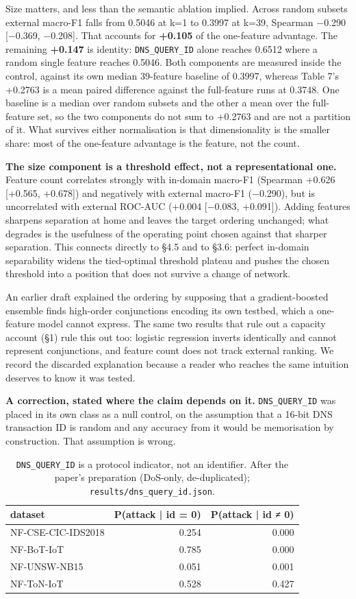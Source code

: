\documentclass[11pt,a4paper]{article}
\begin{document}
Size matters, and less than the semantic ablation implied. Across random subsets external macro-F1 falls from 0.5046 at k=1 to 0.3997 at k=39, Spearman $-$0.290 [$-$0.369, $-$0.208]. That accounts for \textbf{+0.105} of the one-feature advantage. The remaining \textbf{+0.147} is identity: \texttt{DNS\_QUERY\_ID} alone reaches 0.6512 where a random single feature reaches 0.5046. Both components are measured inside the control, against its own median 39-feature baseline of 0.3997, whereas Table 7's +0.2763 is a mean paired difference against the full-feature runs at 0.3748. One baseline is a median over random subsets and the other a mean over the full-feature set, so the two components do not sum to +0.2763 and are not a partition of it. What survives either normalisation is that dimensionality is the smaller share: most of the one-feature advantage is the feature, not the count.

\textbf{The size component is a threshold effect, not a representational one.} Feature count correlates strongly with in-domain macro-F1 (Spearman +0.626 [+0.565, +0.678]) and negatively with external macro-F1 ($-$0.290), but is uncorrelated with external ROC-AUC (+0.004 [$-$0.083, +0.091]). Adding features sharpens separation at home and leaves the target ordering unchanged; what degrades is the usefulness of the operating point chosen against that sharper separation. This connects directly to §4.5 and to §3.6: perfect in-domain separability widens the tied-optimal threshold plateau and pushes the chosen threshold into a position that does not survive a change of network.

An earlier draft explained the ordering by supposing that a gradient-boosted ensemble finds high-order conjunctions encoding its own testbed, which a one-feature model cannot express. The same two results that rule out a capacity account (§1) rule this out too: logistic regression inverts identically and cannot represent conjunctions, and feature count does not track external ranking. We record the discarded explanation because a reader who reaches the same intuition deserves to know it was tested.

\textbf{A correction, stated where the claim depends on it.} \texttt{DNS\_QUERY\_ID} was placed in its own class as a null control, on the assumption that a 16-bit DNS transaction ID is random and any accuracy from it would be memorisation by construction. That assumption is wrong.

\begin{table}[htbp]\centering\small
\caption{\texttt{DNS\_QUERY\_ID} is a protocol indicator, not an identifier. After the paper's preparation (DoS-only, de-duplicated); \texttt{results/dns\_query\_id.json}.}
\begin{tabular}{lrr}
\toprule
dataset & P(attack | id = 0) & P(attack | id ≠ 0) \\
\midrule
NF-CSE-CIC-IDS2018 & 0.254 & 0.000 \\
NF-BoT-IoT & 0.785 & 0.000 \\
NF-UNSW-NB15 & 0.051 & 0.001 \\
NF-ToN-IoT & 0.528 & 0.427 \\
\bottomrule
\end{tabular}
\end{table}
\end{document}
